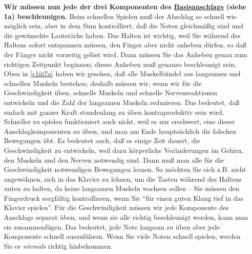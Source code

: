 \textbf{Wir müssen nun jede der drei Komponenten des \hyperref[c1iii1a1]{Basisanschlags} (siehe 1a) beschleunigen.}
Beim schnellen Spielen muß der Abschlag so schnell wie möglich sein, aber in dem Sinn kontrolliert, daß die Noten gleichmäßig sind und die gewünschte Lautstärke haben.
Das Halten ist wichtig, weil Sie während des Haltens sofort entspannen müssen, den Finger aber nicht anheben dürfen, so daß der Fänger nicht vorzeitig gelöst wird.
Dann müssen Sie das Anheben genau zum richtigen Zeitpunkt beginnen; dieses Anheben muß genauso beschleunigt sein.
Oben in \hyperref[c1iii7a]{\autoref{c1iii7a}} haben wir gesehen, daß alle Muskelbündel aus langsamen und schnellen Muskeln bestehen; deshalb müssen wir, wenn wir für die Geschwindigkeit üben, schnelle Muskeln und schnelle Nervenreaktionen entwickeln und die Zahl der langsamen Muskeln reduzieren.
Das bedeutet, daß einfach mit ganzer Kraft stundenlang zu üben kontraproduktiv sein wird.
Schneller zu spielen funktioniert auch nicht, weil es nur erschwert, eine dieser Anschlagkomponenten zu üben, und man am Ende hauptsächlich die falschen Bewegungen übt.
Es bedeutet auch, daß es einige Zeit dauert, die Geschwindigkeit zu entwickeln, weil dazu körperliche Veränderungen im Gehirn, den Muskeln und den Nerven notwendig sind.
Dann muß man alle für die Geschwindigkeit notwendigen Bewegungen lernen.
So möchten Sie sich z.B. nicht angewöhnen, sich in das Klavier zu lehnen, um die Tasten während des Haltens unten zu halten, da keine langsamen Muskeln wachsen sollen -- Sie müssen den Fingerdruck sorgfältig kontrollieren, wenn Sie \enquote{für einen guten Klang tief in das Klavier spielen}.
Für die Geschwindigkeit müssen wir jede Komponente des Anschlags separat üben, und wenn sie alle richtig beschleunigt werden, kann man sie zusammenfügen.
Das bedeutet, jede Note langsam zu üben aber jede Komponente schnell auszuführen.
Wenn Sie viele Noten schnell spielen, werden Sie es \textit{niemals} richtig hinbekommen.

